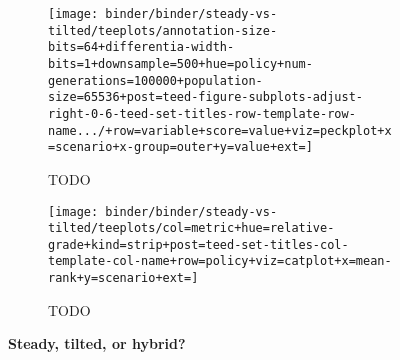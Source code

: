 \begin{figure*}
  \centering
  \begin{subfigure}[b]{0.42\textwidth}
    \centering
    \texttt{[image: binder/binder/steady-vs-tilted/teeplots/annotation-size-bits=64+differentia-width-bits=1+downsample=500+hue=policy+num-generations=100000+population-size=65536+post=teed-figure-subplots-adjust-right-0-6-teed-set-titles-row-template-row-name.../+row=variable+score=value+viz=peckplot+x=scenario+x-group=outer+y=value+ext=]}
    \caption{TODO}
  \end{subfigure}%
  \begin{subfigure}[b]{0.58\textwidth}
    \centering
    \texttt{[image: binder/binder/steady-vs-tilted/teeplots/col=metric+hue=relative-grade+kind=strip+post=teed-set-titles-col-template-col-name+row=policy+viz=catplot+x=mean-rank+y=scenario+ext=]}
    \caption{TODO}
  \end{subfigure}
  \caption{%
    \textbf{Steady, tilted, or hybrid?}
  }
  \label{fig:steady-vs-tilted-summary}
\end{figure*}
